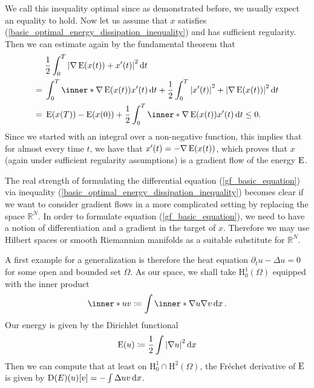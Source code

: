 We call this inequality optimal since as demonstrated before, we usually expect an equality to hold.
Now let us assume that $ x $ satisfies (\ref{basic_optimal_energy_dissipation_inequality}) and has sufficient regularity.
Then we can estimate again by the fundamental theorem that
\begin{align*}
	& \frac{ 1 }{ 2 }
	\int_{ 0 }^{ T }
		\abs{
			\nabla \energy ( x ( t ) )
			+
			x' ( t ) 
		}^{ 2 }
	\dd{ t }
	\\
	={} &
	\int_{ 0 }^{ T }
		\inner*{ \nabla \energy ( x ( t ) ) }{ x' ( t ) }
	\dd{ t }
	+
	\frac{ 1 }{ 2 }
	\int_{ 0 }^{ T }
		\abs{ x' ( t ) }^{ 2 }
		+
		\abs{ \nabla \energy ( x ( t ) ) }^{ 2 }
	\dd{ t }
	\\
	={} &
	\energy ( x ( T ) ) - \energy ( x ( 0 ) ) 
	+
	\frac{ 1 }{ 2 }
	\int_{ 0 }^{ T }
		\inner*{ \nabla \energy ( x ( t ) ) }{ x' ( t ) }
	\dd{ t }
	\leq 0.
\end{align*}
Since we started with an integral over a non-negative function, this implies that for almost every time $ t $, we have that $ x' ( t ) = - \nabla \operatorname{E} ( x ( t ) ) $, which proves that $ x $ (again under sufficient regularity assumptions) is a gradient flow of the energy $ \operatorname{E} $.

The real strength of formulating the differential equation (\ref{gf_basic_equation}) via inequality (\ref{basic_optimal_energy_dissipation_inequality}) becomes clear if we want to consider gradient flows in a more complicated setting by replacing the space $ \mathbb{ R }^{ N } $. In order to formulate equation (\ref{gf_basic_equation}), we need to have a notion of differentiation and a gradient in the target of $ x $. Therefore we may use Hilbert spaces or smooth Riemannian manifolds as a suitable substitute for $ \mathbb{ R }^{ N } $. 

A first example for a generalization is therefore the heat equation $ \partial_{ t } u - \Delta u = 0 $ for some open and bounded set $ \Omega $. As our space, we shall take $ \mathrm{ H }_{ 0 }^{ 1 } ( \Omega ) $ equipped with the inner product
\begin{equation*}
	\inner*{ u }{ v }
	\coloneqq
	\int
		\inner*{ \nabla u }{ \nabla v }
	\dd{ x }.
\end{equation*}
Our energy is given by the Dirichlet functional
\begin{equation*}
	\operatorname{E} ( u ) \coloneqq
	\frac{ 1 }{ 2 }
	\int
		\abs{ \nabla u }^{ 2 }
	\dd{ x }
\end{equation*}
Then we can compute that at least on $ \mathrm{ H }_{ 0 }^{ 1 } \cap \mathrm{ H }^{ 2 } ( \Omega ) $, the Fréchet derivative of $ \operatorname{E} $ is given by $ \operatorname{D} ( E ) ( u ) [ v ] = - \int \Delta u v \dd{ x } $.